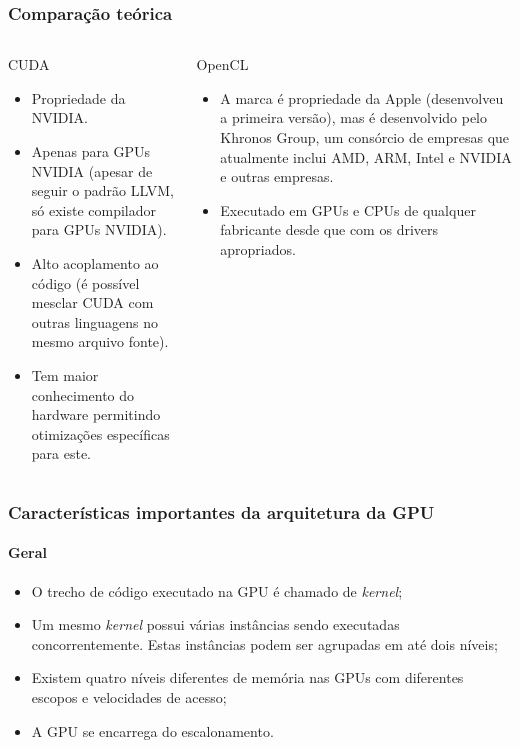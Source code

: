 \documentclass[brazil, 10pt]{beamer}
\begin{document}
\begin{frame}
  \frametitle{Comparação teórica}

\begin{columns}
  \begin{column}{.5\textwidth}
    CUDA
    
    \begin{itemize}
      \item Propriedade da NVIDIA.
      \item Apenas para GPUs NVIDIA (apesar de seguir o padrão LLVM, só existe compilador para GPUs NVIDIA).
      \item Alto acoplamento ao código (é possível mesclar CUDA com outras linguagens no mesmo arquivo fonte).
      \item Tem maior conhecimento do hardware permitindo otimizações específicas para este.
    \end{itemize}
  \end{column}
  \begin{column}{.5\textwidth}
    OpenCL    
    
    \begin{itemize}
      \item A marca é propriedade da Apple (desenvolveu a primeira versão), mas é desenvolvido pelo Khronos Group, um consórcio de empresas que atualmente inclui AMD, ARM, Intel e NVIDIA e outras empresas.
      \item Executado em GPUs e CPUs de qualquer fabricante desde que com os drivers apropriados.
    \end{itemize}
  \end{column}
\end{columns}
\end{frame}

\begin{frame}
  \frametitle{Características importantes da arquitetura da GPU}
  \framesubtitle{Geral}
  
  \begin{itemize}
    \item O trecho de código executado na GPU é chamado de \textit{kernel};
    \item Um mesmo \textit{kernel} possui várias instâncias sendo executadas concorrentemente. Estas instâncias podem ser agrupadas em até dois níveis;
    \item Existem quatro níveis diferentes de memória nas GPUs com diferentes escopos e velocidades de acesso;
    \item A GPU se encarrega do escalonamento.
  \end{itemize}
\end{frame}
\end{document}
